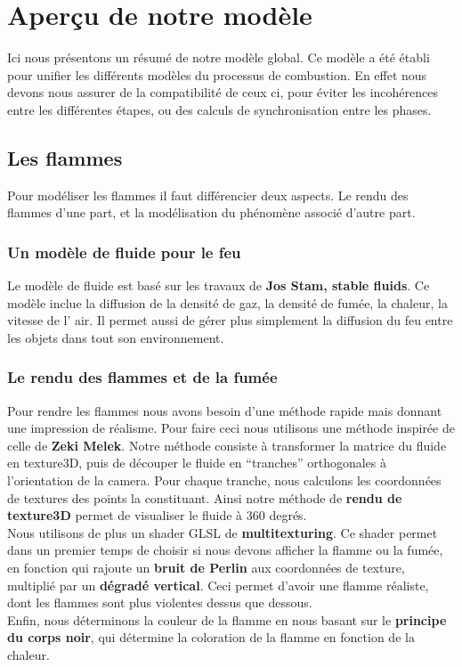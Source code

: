 \documentclass[a4paper,10pt]{article}
\begin{document}
\newpage
\section{Aperçu de notre modèle}
Ici nous présentons un résumé de notre modèle global. Ce modèle a été
établi pour unifier les différents modèles du processus de combustion. 
En effet nous devons nous assurer de la compatibilité de ceux ci, pour éviter les incohérences entre les
différentes étapes, ou des calculs de synchronisation entre les
phases. 

\subsection{Les flammes}
Pour modéliser les flammes il faut différencier deux aspects. Le rendu
des flammes d'une part, et la modélisation du phénomène associé
d'autre part.

\subsubsection{Un modèle de fluide pour le feu}
Le modèle de fluide est basé sur les travaux de \textbf{Jos Stam, stable fluids}. 
Ce modèle inclue la diffusion de la densité de gaz, la densité de fumée, la chaleur, 
la vitesse de l' air. Il permet aussi de gérer plus
simplement la diffusion du feu entre les objets dans tout son environnement.

\subsubsection{Le rendu des flammes et de la fumée}
Pour rendre les flammes nous avons besoin d'une méthode rapide mais
donnant une impression de réalisme. Pour faire ceci nous utilisons une
méthode inspirée de celle de \textbf{Zeki Melek}. Notre méthode consiste à
transformer la matrice du fluide en texture3D, puis de découper le fluide en 
``tranches'' orthogonales à l'orientation de la camera. Pour chaque tranche,
nous calculons les coordonnées de textures des points la constituant. 
Ainsi notre méthode de \textbf{rendu de texture3D} permet de visualiser le fluide
à 360 degrés.\\
Nous utilisons de plus un shader GLSL de \textbf{multitexturing}. Ce shader
permet dans un premier temps de choisir si nous devons afficher la flamme ou la
fumée, en fonction qui rajoute un \textbf{bruit de Perlin}
aux coordonnées de texture, multiplié par un \textbf{dégradé vertical}. Ceci
permet d'avoir une flamme réaliste, dont les flammes sont plus violentes
dessus que dessous.\\
Enfin, nous déterminons la couleur de la flamme en nous basant sur le
\textbf{principe du corps noir}, qui détermine la coloration de la flamme
en fonction de la chaleur.
\end{document}
